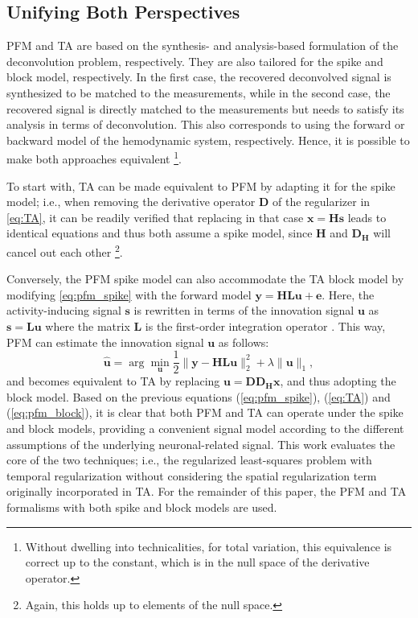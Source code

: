 \subsection{Unifying Both Perspectives}
\label{sec:unifying_both_perspectives}
PFM and TA are based on the synthesis- and analysis-based formulation of the
deconvolution problem, respectively. They are also tailored for the spike and
block model, respectively. In the first case, the recovered deconvolved signal
is synthesized to be matched to the measurements, while in the second case, the
recovered signal is directly matched to the measurements but needs to satisfy
its analysis in terms of deconvolution. This also corresponds to using the
forward or backward model of the hemodynamic system, respectively. Hence, it is
possible to make both approaches equivalent
\citep{Elad2007Analysisversussynthesis}\footnote{Without dwelling into
technicalities, for total variation, this equivalence is correct up to the
constant, which is in the null space of the derivative operator.}.

To start with, TA can be made equivalent to PFM by adapting it for the spike
model; i.e., when removing the derivative operator $\mathbf{D}$ of the
regularizer in \cref{eq:TA}, it can be readily verified that replacing in that
case $\mathbf{x}=\mathbf{Hs}$ leads to identical equations and thus both assume
a spike model, since $\mathbf{H}$ and $\mathbf{D_H}$ will cancel out each other
\citep{Karahanoglu2011SignalProcessingApproach}\footnote{Again, this holds up to
elements of the null space.}.

Conversely, the PFM spike model can also accommodate the TA block model by
modifying \cref{eq:pfm_spike} with the forward model $\mathbf{y} = \mathbf{H L
u} + \mathbf{e}$. Here, the activity-inducing signal $\mathbf{s}$ is rewritten
in terms of the innovation signal $\mathbf{u}$ as $\mathbf{s}=\mathbf{Lu}$ where
the matrix $\mathbf{L}$ is the first-order integration operator
\citep{Cherkaoui2019Sparsitybasedblind,Urunuela2020StabilityBasedSparse}. This
way, PFM can estimate the innovation signal $\mathbf{u}$ as follows:
\begin{equation}
    \label{eq:pfm_block}
    \hat{\mathbf{u}} = \arg \min_{\mathbf{u}} \frac{1}{2} \| \mathbf{y} - \mathbf{HLu} \|_2^2 + \lambda \| \mathbf{u} \|_1,
\end{equation}
and becomes equivalent to TA by replacing $\mathbf{u}=\mathbf{D D_H x}$, and
thus adopting the block model. Based on the previous equations
(\cref{eq:pfm_spike}), (\cref{eq:TA}) and (\cref{eq:pfm_block}), it is clear
that both PFM and TA can operate under the spike and block models, providing a
convenient signal model according to the different assumptions of the underlying
neuronal-related signal. This work evaluates the core of the two techniques;
i.e., the regularized least-squares problem with temporal regularization without
considering the spatial regularization term originally incorporated in TA. For
the remainder of this paper, the PFM and TA formalisms with both spike and block
models are used.

